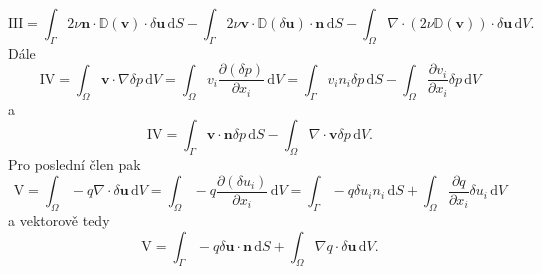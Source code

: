 \begin{equation}\label{eq:clen_III}
\mathrm{III}
=
\int_{\Gamma} 
2\nu \mathbf{n} \cdot  \mathbb{D}(\mathbf{v})\cdot \delta \mathbf{u}
\, \mathrm{d}S
- \int_{\Gamma} 
2\nu \mathbf{v} \cdot  \mathbb{D}(\delta \mathbf{u})\cdot \mathbf{n}
\, \mathrm{d}S
-
\int_{\Omega} 
\nabla \cdot \left( 2\nu \mathbb{D}(\mathbf{v}) \right) \cdot \delta \mathbf{u}
\, \mathrm{d}V.
\end{equation}
Dále
\begin{equation*}
\mathrm{IV}
=
\int_{\Omega} 
\mathbf{v} \cdot \nabla \delta p
\, \mathrm{d}V
=
\int_{\Omega} 
v_i \frac{\partial (\delta p) }{\partial x_i}
\, \mathrm{d}V
=
\int_{\Gamma} 
v_i n_i \delta p 
\, \mathrm{d}S
-
\int_{\Omega} 
 \frac{\partial v_i }{\partial x_i} \delta p
\, \mathrm{d}V
\end{equation*}
a 
\begin{equation}\label{eq:clen_IV}
\mathrm{IV}
=
\int_{\Gamma} 
\mathbf{v}\cdot \mathbf{n} \delta p 
\, \mathrm{d}S
-
\int_{\Omega} 
\nabla \cdot \mathbf{v} \delta p
\, \mathrm{d}V.
\end{equation}
Pro poslední člen pak
\begin{equation*}
\mathrm{V}
=
\int_{\Omega} 
- q \nabla \cdot \delta \mathbf{u}
\, \mathrm{d}V
=
\int_{\Omega} 
- q \frac{\partial (\delta u_i)}{\partial x_i}
\, \mathrm{d}V
= 
\int_{\Gamma} 
- q \delta u_i n_i
\, \mathrm{d}S
+
\int_{\Omega} 
 \frac{\partial q}{\partial x_i} \delta u_i
\, \mathrm{d}V
\end{equation*}
a vektorově tedy
\begin{equation}\label{eq:clen_V}
\mathrm{V}
=
\int_{\Gamma} 
- q \delta \mathbf{u \cdot n}
\, \mathrm{d}S
+
\int_{\Omega} 
\nabla q \cdot \delta \mathbf{u}
\, \mathrm{d}V.
\end{equation}

